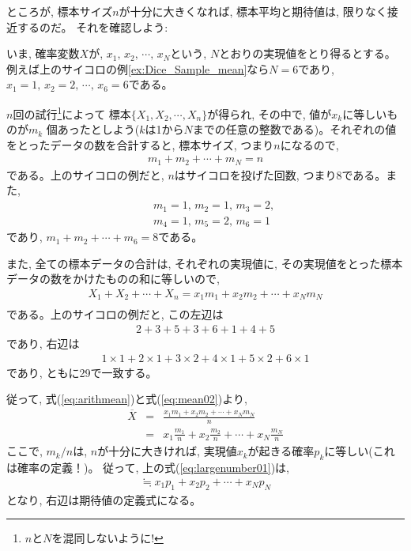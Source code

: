 ところが, 標本サイズ$n$が十分に大きくなれば, 標本平均と期待値は, 限りなく接近するのだ。
それを確認しよう:

いま, 確率変数$X$が, $x_1,\, x_2,\, \cdots,\, x_N$という, $N$とおりの実現値をとり得るとする。
例えば上のサイコロの例\ref{ex:Dice_Sample_mean}なら$N=6$であり, $x_1=1,\, x_2=2,\, \cdots,\, x_6=6$である。

$n$回の試行\footnote{$n$と$N$を混同しないように!}によって
標本$\{X_1, X_2, \cdots, X_n\}$が得られ, その中で, 値が$x_k$に等しいものが$m_k$
個あったとしよう($k$は1から$N$までの任意の整数である)。それぞれの値をとったデータの数を合計すると, 
標本サイズ, つまり$n$になるので, 
\begin{eqnarray}m_1+m_2+\cdots+m_N=n\end{eqnarray}
である。上のサイコロの例だと, $n$はサイコロを投げた回数, つまり8である。また, 
\begin{eqnarray*}
&&m_1=1,\, m_2=1,\, m_3=2,\\
&&m_4=1,\, m_5=2,\, m_6=1
\end{eqnarray*}
であり, $m_1+m_2+\cdots+m_6=8$である。

また, 全ての標本データの合計は, それぞれの実現値に, その実現値をとった標本データの数をかけたものの和に等しいので, 
\begin{eqnarray}
X_1+X_2+\cdots+X_n=x_1m_1+x_2m_2+\cdots+x_Nm_N\nonumber\\
\label{eq:mean02}
\end{eqnarray}
である。上のサイコロの例だと, この左辺は
\begin{eqnarray*}2+3+5+3+6+1+4+5\end{eqnarray*}
であり, 右辺は
\begin{eqnarray*}1\times1+2\times1+3\times2+4\times1+5\times2+6\times1\end{eqnarray*}
であり, ともに29で一致する。

従って, 式(\ref{eq:arithmean})と式(\ref{eq:mean02})より, 
\begin{eqnarray}
\overline{X} &=& \frac{x_1m_1+x_2m_2+\cdots+x_Nm_N}{n}\\
&=&x_1\frac{m_1}{n}+x_2\frac{m_2}{n}+\cdots+x_N\frac{m_N}{n}\label{eq:largenumber01}
\end{eqnarray}
ここで, $m_k/n$は, $n$が十分に大きければ, 実現値$x_k$が起きる確率$p_k$に等しい(これは確率の定義！)。
従って, 上の式(\ref{eq:largenumber01})は, 
\begin{eqnarray}
\fallingdotseq x_1p_1+x_2p_2+\cdots+x_Np_N
\end{eqnarray}
となり, 右辺は期待値の定義式になる。

